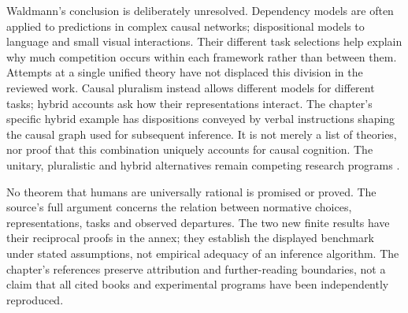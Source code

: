 Waldmann's conclusion is deliberately unresolved. Dependency models
are often applied to predictions in complex causal networks;
dispositional models to language and small visual interactions. Their
different task selections help explain why much competition occurs
within each framework rather than between them. Attempts at a single
unified theory have not displaced this division in the reviewed work.
Causal pluralism instead allows different models for different tasks;
hybrid accounts ask how their representations interact. The chapter's
specific hybrid example has dispositions conveyed by verbal instructions
shaping the causal graph used for subsequent inference. It is not
merely a list of theories, nor proof that this combination uniquely
accounts for causal cognition. The unitary, pluralistic and hybrid
alternatives remain competing research programs
\cite[Sec.~4, pp.~445--446]{Waldmann2021EverydayCausal}.

No theorem that humans are universally rational is promised or proved.
The source's full argument concerns the relation between normative
choices, representations, tasks and observed departures. The two new
finite results have their reciprocal proofs in the annex; they establish
the displayed benchmark under stated assumptions, not empirical adequacy
of an inference algorithm. The chapter's references preserve attribution
and further-reading boundaries, not a claim that all cited books and
experimental programs have been independently reproduced.

